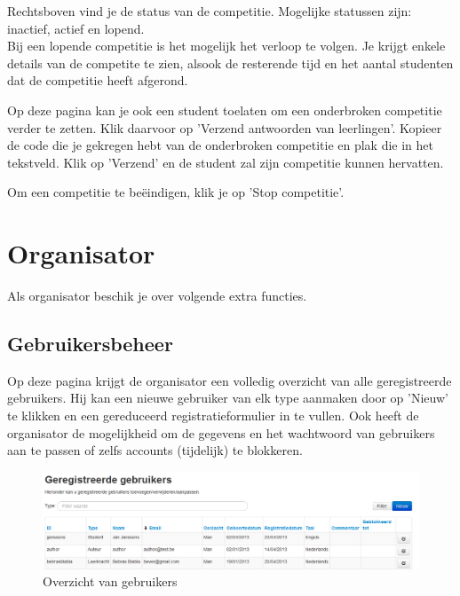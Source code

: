\documentclass[]{article}
\begin{document}
Rechtsboven vind je de status van de competitie. Mogelijke statussen zijn: inactief, actief en lopend. \\
Bij een lopende competitie is het mogelijk het verloop te volgen. Je krijgt enkele details van de competite te zien, alsook de resterende tijd en het aantal studenten dat de competitie heeft afgerond. 

Op deze pagina kan je ook een student toelaten om een onderbroken competitie verder te zetten. Klik daarvoor op 'Verzend antwoorden van leerlingen'. Kopieer de code die je gekregen hebt van de onderbroken competitie en plak die in het tekstveld. Klik op 'Verzend' en de student zal zijn competitie kunnen hervatten.

Om een competitie te beëindigen, klik je op 'Stop competitie'.

\section{Organisator}

Als organisator beschik je over volgende extra functies.

\subsection{Gebruikersbeheer}
Op deze pagina krijgt de organisator een volledig overzicht van alle geregistreerde gebruikers. Hij kan een nieuwe gebruiker van elk type aanmaken door op 'Nieuw' te klikken en een gereduceerd registratieformulier in te vullen. Ook heeft de organisator de mogelijkheid om de gegevens en het wachtwoord van gebruikers aan te passen of zelfs accounts (tijdelijk) te blokkeren. 

\begin{figure}[!ht]
	\centering
	\includegraphics[width=1\textwidth]{img/usermgmt}
	\caption{Overzicht van gebruikers}
	\label{usermgmt}
\end{figure}
\end{document}
